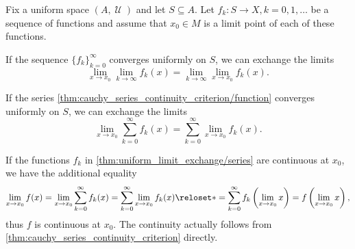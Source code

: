 \begin{theorem}\label{thm:uniform_limit_exchange}
  Fix a uniform space \( (A, \mscrU) \) and let \( S \subseteq A \). Let \( f_k: S \to X, k = 0, 1, \ldots \) be a sequence of functions and assume that \( x_0 \in M \) is a limit point of each of these functions.

  \begin{thmenum}
     If the sequence \( \{ f_k \}_{k=0}^\infty \) converges uniformly on \( S \), we can exchange the limits
    \begin{equation*}
      \lim_{x \to x_0} \lim_{k \to \infty} f_k(x)
      =
      \lim_{k \to \infty} \lim_{x \to x_0} f_k(x).
    \end{equation*}

     If the series \cref{thm:cauchy_series_continuity_criterion/function} converges uniformly on \( S \), we can exchange the limits
    \begin{equation*}
      \lim_{x \to x_0} \sum_{k=0}^\infty f_k(x)
      =
      \sum_{k=0}^\infty \lim_{x \to x_0} f_k(x).
    \end{equation*}
  \end{thmenum}
\end{theorem}

\begin{remark}\label{rem:thm:uniform_limit_exchange_continuity}
  If the functions \( f_k \) in \cref{thm:uniform_limit_exchange/series} are continuous at \( x_0 \), we have the additional equality
  \begin{equation}\label{thm:uniform_limit_exchange/continuous_equality}
    \lim_{x \to x_0} f(x)
    =
    \lim_{x \to x_0} \sum_{k=0}^\infty f_k(x)
    =
    \sum_{k=0}^\infty \lim_{x \to x_0} f_k(x)
    \reloset * =
    \sum_{k=0}^\infty f_k\left(\lim_{x \to x_0} x \right)
    =
    f\left(\lim_{x \to x_0} x \right),
  \end{equation}
  thus \( f \) is continuous at \( x_0 \). The continuity actually follows from \cref{thm:cauchy_series_continuity_criterion} directly.
\end{remark}

